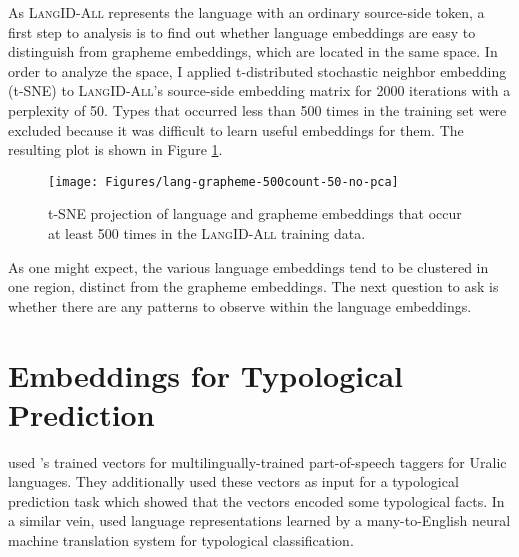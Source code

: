 

As \textsc{LangID-All} represents the language with an ordinary source-side token, a first step to analysis is to find out whether language embeddings are easy to distinguish from grapheme embeddings, which are located in the same space. In order to analyze the space, I applied t-distributed stochastic neighbor embedding (t-SNE) \citep{maaten2008visualizing} to \textsc{LangID-All}'s source-side embedding matrix for 2000 iterations with a perplexity of 50. Types that occurred less than 500 times in the training set were excluded because it was difficult to learn useful embeddings for them. The resulting plot is shown in Figure \ref{figure:l-g-tsne}.

\begin{figure}
\begin{center}
\texttt{[image: Figures/lang-grapheme-500count-50-no-pca]}
\end{center}
\caption{t-SNE projection of language and grapheme embeddings that occur at least 500 times in the \textsc{LangID-All} training data.}
\label{figure:l-g-tsne}
\end{figure}

As one might expect, the various language embeddings tend to be clustered in one region, distinct from the grapheme embeddings. The next question to ask is whether there are any patterns to observe within the language embeddings.

\section{Embeddings for Typological Prediction}
\label{typo-pred}
\cite{bjerva2017tracking} used \citeauthor{ostling2017continuous}'s trained vectors for multilingually-trained part-of-speech taggers for Uralic languages. They additionally used these vectors as input for a typological prediction task which showed that the vectors encoded some typological facts. In a similar vein, \cite{malaviya17emnlp} used language representations learned by a many-to-English neural machine translation system for typological classification.

